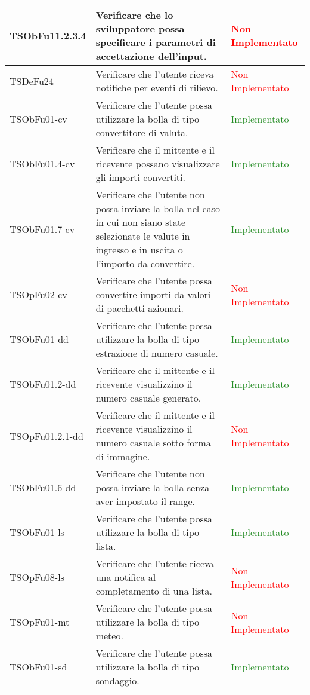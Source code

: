 \begin{center}
\begin{longtable}{|
*{1}{>{\centering\arraybackslash}p{2.8cm}|}
*{1}{>{\centering\arraybackslash}p{6cm}|}
*{1}{>{\centering\arraybackslash}p{3cm}|}}
 \hline 
TSObFu11.2.3.4 & Verificare che lo sviluppatore possa specificare i parametri di accettazione dell'input. & \textcolor{Red}{Non Implementato}\\
 \hline 
TSDeFu24 & Verificare che l'utente riceva notifiche per eventi di rilievo. & \textcolor{Red}{Non Implementato}\\
 \hline 
TSObFu01-cv & Verificare che l'utente possa utilizzare la bolla di tipo convertitore di valuta. & \textcolor{ForestGreen}{Implementato}\\
 \hline 
TSObFu01.4-cv & Verificare che il mittente e il ricevente possano visualizzare gli importi convertiti. & \textcolor{ForestGreen}{Implementato}\\
 \hline 
TSObFu01.7-cv & Verificare che l'utente non possa inviare la bolla nel caso in cui non siano state selezionate le valute in ingresso e in uscita o l'importo da convertire. & \textcolor{ForestGreen}{Implementato}\\
 \hline 
TSOpFu02-cv & Verificare che l'utente possa convertire importi da valori di pacchetti azionari. & \textcolor{Red}{Non Implementato}\\
 \hline 
TSObFu01-dd & Verificare che l'utente possa utilizzare la bolla di tipo estrazione di numero casuale. & \textcolor{ForestGreen}{Implementato}\\
 \hline 
TSObFu01.2-dd & Verificare che il mittente e il ricevente visualizzino il numero casuale generato. & \textcolor{ForestGreen}{Implementato}\\
 \hline 
TSOpFu01.2.1-dd & Verificare che il mittente e il ricevente visualizzino il numero casuale sotto forma di immagine. & \textcolor{Red}{Non Implementato}\\
 \hline 
TSObFu01.6-dd & Verificare che l'utente non possa inviare la bolla senza aver impostato il range. & \textcolor{ForestGreen}{Implementato}\\
 \hline 
TSObFu01-ls & Verificare che l'utente possa utilizzare la bolla di tipo lista. & \textcolor{ForestGreen}{Implementato}\\
 \hline 
TSOpFu08-ls & Verificare che l'utente riceva una notifica al completamento di una lista. & \textcolor{Red}{Non Implementato}\\
 \hline 
TSOpFu01-mt & Verificare che l'utente possa utilizzare la bolla di tipo meteo. & \textcolor{Red}{Non Implementato}\\
 \hline 
TSObFu01-sd & Verificare che l'utente possa utilizzare la bolla di tipo sondaggio. & \textcolor{ForestGreen}{Implementato}\\

\end{longtable}
\end{center}
